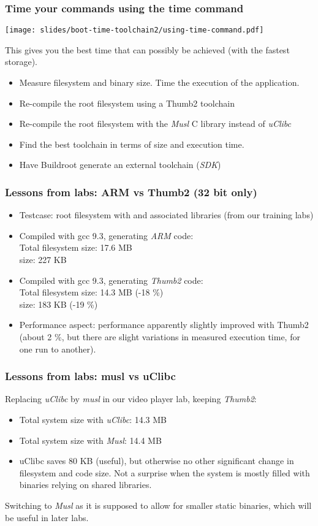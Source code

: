 \begin{frame}
\frametitle{Time your commands using the time command}
\begin{center}
\texttt{[image: slides/boot-time-toolchain2/using-time-command.pdf]}
\end{center}
This gives you the best time that can possibly be achieved (with the fastest storage).
\end{frame}

{
\begin{itemize}
\item Measure filesystem and  binary size. Time
      the execution of the application.
\item Re-compile the root filesystem using a Thumb2 toolchain
\item Re-compile the root filesystem with the {\em Musl}
      C library instead of {\em uClibc}
\item Find the best toolchain in terms of size and execution time.
\item Have Buildroot generate an external toolchain ({\em SDK})
\end{itemize}
}


\begin{frame}
\frametitle{Lessons from labs: ARM vs Thumb2 (32 bit only)}
\begin{itemize}
\item Testcase: root filesystem with  and associated
      libraries (from our training labs)
\item Compiled with gcc 9.3, generating {\em ARM} code:\\
      Total filesystem size: 17.6 MB\\
       size: 227 KB
\item Compiled with gcc 9.3, generating {\em Thumb2} code:\\
      Total filesystem size: 14.3 MB (-18 \%)\\
       size: 183 KB (-19 \%)
\item Performance aspect: performance apparently slightly improved with Thumb2
      (about 2 \%, but there are slight variations in measured
      execution time, for one run to another).
\end{itemize}
\end{frame}

\begin{frame}
\frametitle{Lessons from labs: musl vs uClibc}
Replacing {\em uClibc} by {\em musl} in our video player lab, keeping
{\em Thumb2}:
\begin{itemize}
   \item Total system size with {\em uClibc}: 14.3 MB
   \item Total system size with {\em Musl}: 14.4 MB
   \item uClibc saves 80 KB (useful), but otherwise no other significant change
    in filesystem and code size. Not a surprise when the system is mostly filled
    with binaries relying on shared libraries.
\end{itemize}
Switching to {\em Musl} as it is supposed to allow for smaller static
binaries, which will be useful in later labs.
\end{frame}
